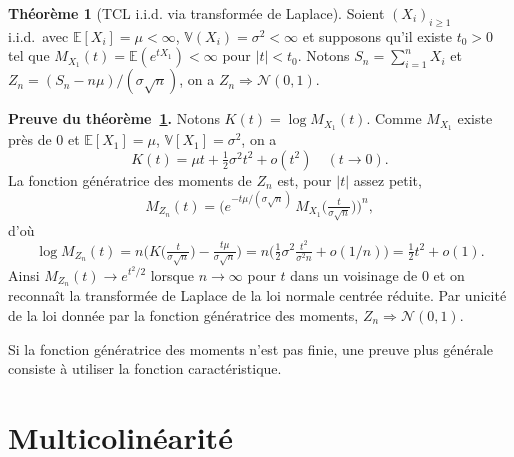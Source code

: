 \documentclass[10pt,a4paper]{article}
\theoremstyle{definition}
\newtheorem{theorem}{Théorème}
\renewcommand{\newline}{\unskip\par\vspace{1.5pt}}
\begin{document}
\begin{notes}

  \bigskip

\begin{theorem}[TCL i.i.d. via transformée de Laplace]\label{thm:tcl}
Soient $(X_i)_{i\ge1}$ i.i.d.\ avec $\mathbb E[X_i]=\mu<\infty$, $\mathbb V(X_i)=\sigma^2<\infty$
et supposons qu'il existe $t_0>0$ tel que $M_{X_1}(t)=\mathbb E(e^{tX_1})<\infty$ pour $|t|<t_0$.
Notons $S_n=\sum_{i=1}^n X_i$ et $Z_n=(S_n-n\mu)/(\sigma\sqrt n)$, on a $Z_n\Rightarrow\mathcal N(0,1)$.
\end{theorem}

\bigskip

\textbf{Preuve du théorème~\ref{thm:tcl}.} Notons $K(t)=\log M_{X_1}(t)$. Comme $M_{X_1}$ existe près de $0$
et $\mathbb E [X_1]=\mu$, $\mathbb V [X_1]=\sigma^2$, on a
\[
K(t)=\mu t+\tfrac12\sigma^2t^2+o(t^2)\quad(t\to0).
\]
La fonction génératrice des moments  de $Z_n$ est, pour $|t|$ assez petit,
\[
M_{Z_n}(t)=\Big(e^{-t\mu/(\sigma\sqrt n)}\,M_{X_1}\!\big(\tfrac{t}{\sigma\sqrt n}\big)\Big)^n,
\]
d'où
\[
\log M_{Z_n}(t)=n\Big(K\!\big(\tfrac{t}{\sigma\sqrt n}\big)-\tfrac{t\mu}{\sigma\sqrt n}\Big)
= n\Big(\tfrac12\sigma^2 \tfrac{t^2}{\sigma^2 n}+o(1/n)\Big)=\tfrac12 t^2+o(1).
\]
Ainsi $M_{Z_n}(t)\to e^{t^2/2}$ lorsque $n\to\infty$ pour $t$ dans un
voisinage de $0$ et on reconnaît la transformée de Laplace de la loi
normale centrée réduite.  Par unicité de la loi donnée par la
fonction génératrice des moments, $Z_n\Rightarrow\mathcal N(0,1)$.\newline

Si la fonction génératrice des moments n'est pas finie, une preuve
plus générale consiste à utiliser la fonction caractéristique.

\end{notes}


\section{Multicolinéarité}
\end{document}

